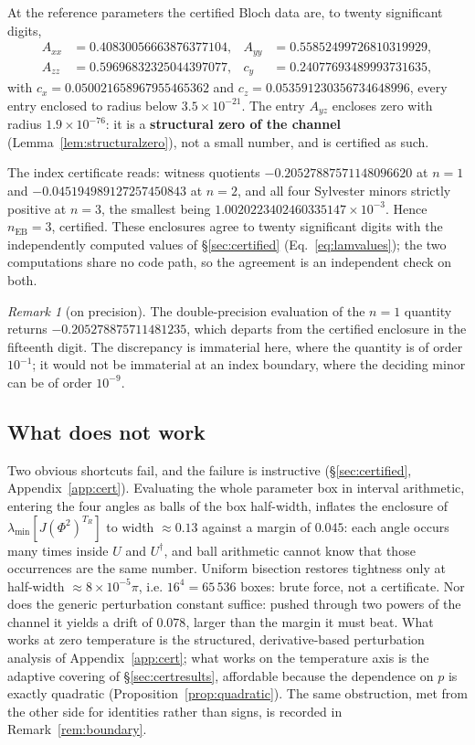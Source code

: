 \documentclass[11pt,a4paper]{article}
\theoremstyle{definition}
\theoremstyle{remark}
\newtheorem{remark}[theorem]{Remark}
\newcommand{\nEB}{n_{\mathrm{EB}}}
\begin{document}
At the reference parameters the certified Bloch data are, to twenty significant digits,
\[
  \begin{aligned}
    A_{xx} &= 0.40830056663876377104, & A_{yy} &= 0.55852499726810319929,\\
    A_{zz} &= 0.59696832325044397077, & c_{y} &= 0.24077693489993731635,
  \end{aligned}
\]
with $c_x = 0.050021658967955465362$ and $c_z = 0.053591230356734648996$, every entry enclosed to radius below $3.5\times10^{-21}$. The entry $A_{yz}$ encloses zero with radius $1.9\times10^{-76}$: it is a \textbf{structural zero of the channel} (Lemma~\ref{lem:structuralzero}), not a small number, and is certified as such.

The index certificate reads: witness quotients $-0.20527887571148096620$ at $n=1$ and $-0.045194989127257450843$ at $n=2$, and all four Sylvester minors strictly positive at $n=3$, the smallest being $1.0020223402460335147\times10^{-3}$. Hence $\nEB = 3$, certified. These enclosures agree to twenty significant digits with the independently computed values of \S\ref{sec:certified} (Eq.~\eqref{eq:lamvalues}); the two computations share no code path, so the agreement is an independent check on both.

\begin{remark}[on precision]
The double-precision evaluation of the $n=1$ quantity returns $-0.205278875711481235$, which departs from the certified enclosure in the fifteenth digit. The discrepancy is immaterial here, where the quantity is of order $10^{-1}$; it would not be immaterial at an index boundary, where the deciding minor can be of order $10^{-9}$.
\end{remark}

\subsection{What does not work}\label{sec:whatfails}

Two obvious shortcuts fail, and the failure is instructive
(\S\ref{sec:certified}, Appendix~\ref{app:cert}). Evaluating the whole
parameter box in interval arithmetic, entering the four angles as balls of the
box half-width, inflates the enclosure of
$\lambda_{\min}[J(\Phi^{2})^{T_{R}}]$ to width $\approx0.13$ against a margin
of $0.045$: each angle occurs many times inside $U$ and $U^{\dagger}$, and
ball arithmetic cannot know that those occurrences are the same number.
Uniform bisection restores tightness only at half-width
$\approx8\times10^{-5}\pi$, i.e. $16^{4}=65\,536$ boxes: brute force, not a
certificate. Nor does the generic perturbation constant suffice: pushed
through two powers of the channel it yields a drift of $0.078$, larger than
the margin it must beat. What works at zero temperature is the structured,
derivative-based perturbation analysis of Appendix~\ref{app:cert}; what works
on the temperature axis is the adaptive covering of \S\ref{sec:certresults},
affordable because the dependence on $p$ is exactly quadratic
(Proposition~\ref{prop:quadratic}). The same obstruction, met from the other
side for identities rather than signs, is recorded in
Remark~\ref{rem:boundary}.
\end{document}
